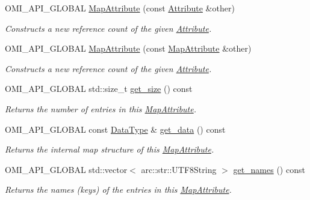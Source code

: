 \begin{DoxyCompactItemize}
\item 
O\+M\+I\+\_\+\+A\+P\+I\+\_\+\+G\+L\+O\+B\+AL \hyperlink{classomi_1_1_map_attribute_a05936738a93a13b8fda8a38fa6e5791f}{Map\+Attribute} (const \hyperlink{classomi_1_1_attribute}{Attribute} \&other)
\begin{DoxyCompactList}\small\item\em Constructs a new reference count of the given \hyperlink{classomi_1_1_attribute}{Attribute}. \end{DoxyCompactList}\item 
O\+M\+I\+\_\+\+A\+P\+I\+\_\+\+G\+L\+O\+B\+AL \hyperlink{classomi_1_1_map_attribute_a84bc4aedd43fa24e278d7bc0bd39d7e4}{Map\+Attribute} (const \hyperlink{classomi_1_1_map_attribute}{Map\+Attribute} \&other)
\begin{DoxyCompactList}\small\item\em Constructs a new reference count of the given \hyperlink{classomi_1_1_attribute}{Attribute}. \end{DoxyCompactList}\item 
O\+M\+I\+\_\+\+A\+P\+I\+\_\+\+G\+L\+O\+B\+AL std\+::size\+\_\+t \hyperlink{classomi_1_1_map_attribute_a3c3118f3575100288c189c21f4dc566d}{get\+\_\+size} () const 
\begin{DoxyCompactList}\small\item\em Returns the number of entries in this \hyperlink{classomi_1_1_map_attribute}{Map\+Attribute}. \end{DoxyCompactList}\item 
O\+M\+I\+\_\+\+A\+P\+I\+\_\+\+G\+L\+O\+B\+AL const \hyperlink{classomi_1_1_map_attribute_ac5a11b90e684944a18bcd18376d7eed1}{Data\+Type} \& \hyperlink{classomi_1_1_map_attribute_a8370199919959e84e1f981375a3bb5f0}{get\+\_\+data} () const 
\begin{DoxyCompactList}\small\item\em Returns the internal map structure of this \hyperlink{classomi_1_1_map_attribute}{Map\+Attribute}. \end{DoxyCompactList}\item 
O\+M\+I\+\_\+\+A\+P\+I\+\_\+\+G\+L\+O\+B\+AL std\+::vector$<$ arc\+::str\+::\+U\+T\+F8\+String $>$ \hyperlink{classomi_1_1_map_attribute_a2b61b6c28fa25d1879e7711138055466}{get\+\_\+names} () const 
\begin{DoxyCompactList}\small\item\em Returns the names (keys) of the entries in this \hyperlink{classomi_1_1_map_attribute}{Map\+Attribute}. \end{DoxyCompactList}\item 

\end{DoxyCompactItemize}
